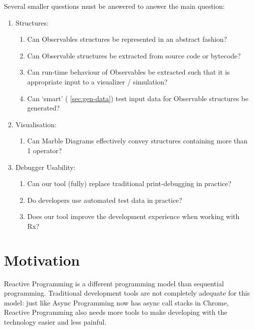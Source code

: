 \noindent
Several smaller questions must be answered to answer the main question:

\begin{enumerate}
    \item
        Structures:
        \begin{enumerate}
            \item
                Can Observables structures be represented in an abstract
                fashion?
            \item
                Can Observable structures be extracted from source code
                or bytecode?
            \item
                Can run-time behaviour of Observables be extracted such
                that it is appropriate input to a visualizer /
                simulation?
            \item
                Can `smart' (%
                \ref{sec:gen-data}) test input data for Observable
                structures be generated?
        \end{enumerate}

    \item
        Visualisation:
        \begin{enumerate}
            \item
                \label{qstn:marble} Can Marble Diagrams effectively
                convey structures containing more than 1 operator?
        \end{enumerate}

    \item
        Debugger Usability:
        \begin{enumerate}
            \item
                \label{qstn:println} Can our tool (fully) replace
                traditional print-debugging in practice?
            \item
                \label{qstn:autogen} Do developers use automated test
                data in practice?
            \item
                \label{qstn:experience} Does our tool improve the
                development experience when working with Rx?
        \end{enumerate}

\end{enumerate}

\section{Motivation}%
Reactive Programming is a different programming model than sequential
programming.  Traditional development tools are not completely adequate
for this model:  just like Async Programming now has async call stacks
in Chrome, Reactive Programming also needs more tools to make developing
with the technology easier and less painful.

